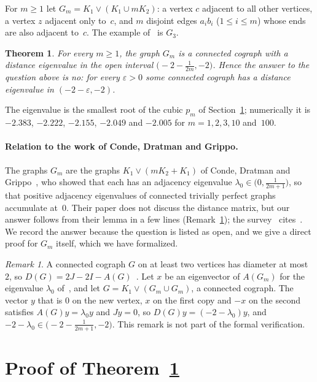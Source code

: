 \documentclass[11pt]{article}
\newtheorem{theorem}{Theorem}
\theoremstyle{remark}
\newtheorem{remark}{Remark}
\begin{document}
For $m\ge1$ let $G_m=K_1\vee(K_1\cup mK_2)$: a vertex $c$ adjacent to all other
vertices, a vertex $z$ adjacent only to~$c$, and $m$ disjoint edges
$a_ib_i$ ($1\le i\le m$) whose ends are also adjacent to~$c$. The example
of~\cite{mmt} is $G_3$.

\begin{theorem}\label{thm:main}
For every $m\ge1$, the graph $G_m$ is a connected cograph with a distance
eigenvalue in the open interval $\bigl(-2-\frac1{2m},-2\bigr)$. Hence the
answer to the question above is no: for every $\varepsilon>0$ some connected
cograph has a distance eigenvalue in $(-2-\varepsilon,-2)$.
\end{theorem}

The eigenvalue is the smallest root of the cubic $p_m$ of Section~\ref{sec:proof};
numerically it is $-2.383$, $-2.222$, $-2.155$, $-2.049$ and $-2.005$ for
$m=1,2,3,10$ and~$100$.

\paragraph{Relation to the work of Conde, Dratman and Grippo.}
The graphs $G_m$ are the graphs $K_1\vee(mK_2+K_1)$ of Conde, Dratman and
Grippo~\cite[Lemma~6 and its proof]{cdg}, who showed that each has an adjacency eigenvalue
$\lambda_0\in\bigl(0,\frac1{2m+1}\bigr)$, so that positive adjacency eigenvalues
of connected trivially perfect graphs accumulate at~$0$. Their paper does not
discuss the distance matrix, but our answer follows from their lemma in a few
lines (Remark~\ref{rem:cdg}); the survey~\cite{mmt} cites~\cite{cdg}. We record
the answer because the question is listed as open, and we give a direct proof
for $G_m$ itself, which we have formalized.

\begin{remark}\label{rem:cdg}
A connected cograph $G$ on at least two vertices has diameter at most~$2$, so
$D(G)=2J-2I-A(G)$~\cite[Proposition ``Diameter'']{mmt}. Let $x$ be an
eigenvector of $A(G_m)$ for the eigenvalue $\lambda_0$ of~\cite{cdg}, and let
$G=K_1\vee(G_m\cup G_m)$, a connected cograph. The vector $y$ that is $0$ on
the new vertex, $x$ on the first copy and $-x$ on the second satisfies
$A(G)y=\lambda_0y$ and $Jy=0$, so $D(G)y=(-2-\lambda_0)y$, and
$-2-\lambda_0\in\bigl(-2-\frac1{2m+1},-2\bigr)$. This remark is not part of
the formal verification.
\end{remark}

\section{Proof of Theorem~\ref{thm:main}}\label{sec:proof}
\end{document}
